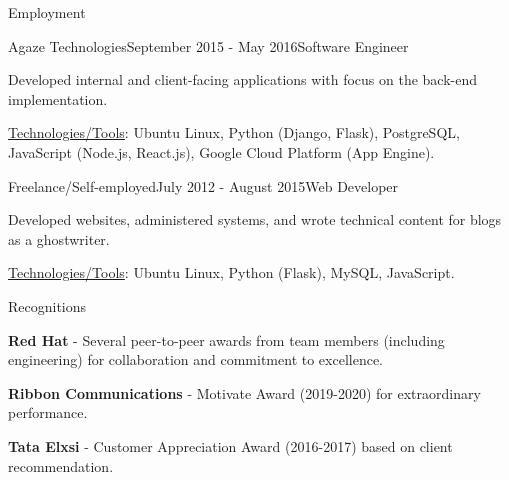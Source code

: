 \documentclass{resume} %
\begin{document}
\begin{rSection}{Employment}

\begin{rSubsection}{Agaze Technologies}{September 2015 - May 2016}{Software Engineer}{}
\item Developed internal and client-facing applications with focus on the back-end implementation.
\item \underline{Technologies/Tools}: Ubuntu Linux, Python (Django, Flask), PostgreSQL, JavaScript (Node.js, React.js), Google Cloud Platform (App Engine).
\end{rSubsection}


\begin{rSubsection}{Freelance/Self-employed}{July 2012 - August 2015}{Web Developer}{}
\item Developed websites, administered systems, and wrote technical content for blogs as a ghostwriter.
\item \underline{Technologies/Tools}: Ubuntu Linux, Python (Flask), MySQL, JavaScript.
\end{rSubsection}

\end{rSection}


\begin{rSection}{Recognitions}

\item {\bf Red Hat} - Several peer-to-peer awards from team members (including engineering) for collaboration and commitment to excellence.
\item {\bf Ribbon Communications} - Motivate Award (2019-2020) for extraordinary performance.
\item {\bf Tata Elxsi} - Customer Appreciation Award (2016-2017) based on client recommendation.

\end{rSection}



\end{document}
